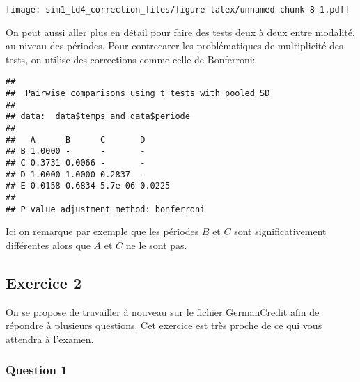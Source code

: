 \documentclass[
]{article}
\newenvironment{Shaded}{\begin{snugshade}}{\end{snugshade}}
\newcommand{\AttributeTok}[1]{\textcolor[rgb]{0.77,0.63,0.00}{#1}}
\newcommand{\FunctionTok}[1]{\textcolor[rgb]{0.00,0.00,0.00}{#1}}
\newcommand{\NormalTok}[1]{#1}
\newcommand{\SpecialCharTok}[1]{\textcolor[rgb]{0.00,0.00,0.00}{#1}}
\newcommand{\StringTok}[1]{\textcolor[rgb]{0.31,0.60,0.02}{#1}}
\begin{document}
\begin{Shaded}
\end{Shaded}

\texttt{[image: sim1\_td4\_correction\_files/figure-latex/unnamed-chunk-8-1.pdf]}

On peut aussi aller plus en détail pour faire des tests deux à deux
entre modalité, au niveau des périodes. Pour contrecarer les
problématiques de multiplicité des tests, on utilise des corrections
comme celle de Bonferroni:

\begin{Shaded}
\end{Shaded}

\begin{verbatim}
## 
##  Pairwise comparisons using t tests with pooled SD 
## 
## data:  data$temps and data$periode 
## 
##   A      B      C       D     
## B 1.0000 -      -       -     
## C 0.3731 0.0066 -       -     
## D 1.0000 1.0000 0.2837  -     
## E 0.0158 0.6834 5.7e-06 0.0225
## 
## P value adjustment method: bonferroni
\end{verbatim}

Ici on remarque par exemple que les périodes \(B\) et \(C\) sont
significativement différentes alors que \(A\) et \(C\) ne le sont pas.

\hypertarget{exercice-2}{%
\subsection{Exercice 2}\label{exercice-2}}

On se propose de travailler à nouveau sur le fichier GermanCredit afin
de répondre à plusieurs questions. Cet exercice est très proche de ce
qui vous attendra à l'examen.

\hypertarget{question-1}{%
\subsubsection{Question 1}\label{question-1}}
\end{document}

